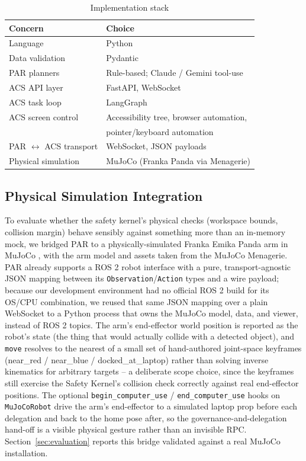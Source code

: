 \documentclass[conference]{IEEEtran}
\begin{document}
\begin{table}[t]
\centering
\caption{Implementation stack}
\label{tab:stack}
\begin{tabular}{@{}ll@{}}
\toprule
Concern & Choice \\
\midrule
Language & Python \\
Data validation & Pydantic \\
PAR planners & Rule-based; Claude / Gemini tool-use \\
ACS API layer & FastAPI, WebSocket \\
ACS task loop & LangGraph \\
ACS screen control & Accessibility tree, browser automation, \\
 & pointer/keyboard automation \\
PAR $\leftrightarrow$ ACS transport & WebSocket, JSON payloads \\
Physical simulation & MuJoCo (Franka Panda via Menagerie) \\
\bottomrule
\end{tabular}
\end{table}

\subsection{Physical Simulation Integration}
\label{sec:mujoco-integration}
To evaluate whether the safety kernel's physical checks (workspace bounds, collision margin) behave
sensibly against something more than an in-memory mock, we bridged PAR to a physically-simulated
Franka Emika Panda arm in MuJoCo \cite{todorov2012mujoco}, with the arm model and assets taken from the
MuJoCo Menagerie. PAR already supports a ROS 2 robot interface with a pure, transport-agnostic JSON
mapping between its \texttt{Observation}/\texttt{Action} types and a wire payload; because our
development environment had no official ROS 2 build for its OS/CPU combination, we reused that same JSON
mapping over a plain WebSocket to a Python process that owns the MuJoCo model, data, and viewer, instead
of ROS 2 topics. The arm's end-effector world position is reported as the robot's state (the thing that
would actually collide with a detected object), and \texttt{move} resolves to the nearest of a small set
of hand-authored joint-space keyframes (near\_red / near\_blue / docked\_at\_laptop) rather than solving
inverse kinematics for arbitrary targets -- a deliberate scope choice, since the keyframes still exercise
the Safety Kernel's collision check correctly against real end-effector positions. The optional
\texttt{begin\_computer\_use} / \texttt{end\_computer\_use} hooks on \texttt{MuJoCoRobot} drive the arm's
end-effector to a simulated laptop prop before each delegation and back to the home pose after, so the
governance-and-delegation hand-off is a visible physical gesture rather than an invisible RPC.
Section~\ref{sec:evaluation} reports this bridge validated against a real MuJoCo installation.
\end{document}
